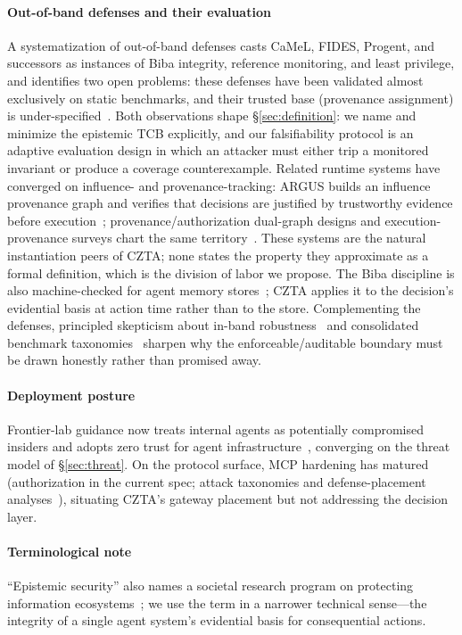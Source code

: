\documentclass[conference]{IEEEtran}
\begin{document}
\paragraph{Out-of-band defenses and their evaluation}
A systematization of out-of-band defenses casts CaMeL, FIDES,
Progent, and successors as instances of Biba integrity, reference
monitoring, and least privilege, and identifies two open problems:
these defenses have been validated almost exclusively on static
benchmarks, and their trusted base (provenance assignment) is
under-specified~\cite{oob}. Both observations shape
\S\ref{sec:definition}: we name and minimize the epistemic TCB
explicitly, and our falsifiability protocol is an adaptive
evaluation design in which an attacker must either trip a
monitored invariant or produce a coverage counterexample. Related
runtime systems have converged on influence- and
provenance-tracking: ARGUS builds an influence provenance graph
and verifies that decisions are justified by trustworthy evidence
before execution~\cite{argus}; provenance/authorization dual-graph
designs and execution-provenance surveys chart the same
territory~\cite{tracessurvey}. These systems are the natural
instantiation peers of CZTA; none states the property they
approximate as a formal definition, which is the
division of labor we propose. The Biba discipline is also machine-checked for agent memory
stores~\cite{louck2026tmanm}; CZTA applies it to the decision's
evidential basis at action time rather than to the store. Complementing the defenses,
principled skepticism about in-band robustness~\cite{abdelnabi}
and consolidated benchmark taxonomies~\cite{benchtax} sharpen why
the enforceable/auditable boundary must be drawn honestly rather
than promised away.

\paragraph{Deployment posture}
Frontier-lab guidance now treats internal agents as potentially
compromised insiders and adopts zero trust for agent
infrastructure~\cite{controlroadmap}, converging on the threat
model of \S\ref{sec:threat}. On the protocol surface, MCP
hardening has matured (authorization in the current spec; attack
taxonomies and defense-placement analyses~\cite{mcpspec,owaspmcp,mcpdpt}),
situating CZTA's gateway placement but not addressing the decision
layer.

\paragraph{Terminological note}
``Epistemic security'' also names a societal research program on
protecting information ecosystems~\cite{seger}; we use the term in
a narrower technical sense---the integrity of a single agent
system's evidential basis for consequential actions.
\end{document}
